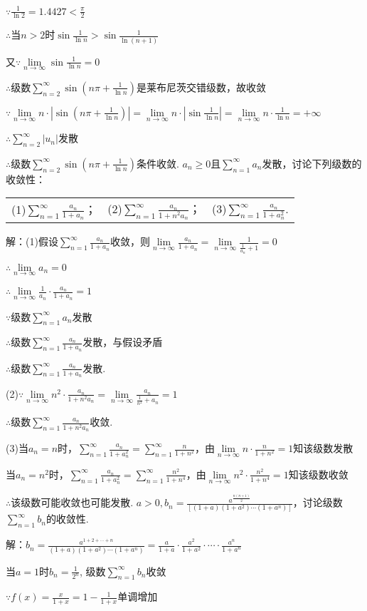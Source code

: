 \documentclass[12pt,UTF8]{ctexart}
\newcommand\Lim[0]{\lim\limits_{n\rightarrow\infty}}
\newcommand\Ser[1]{\sum_{n=#1}^\infty}
\begin{document}
\begin{enumerate}
$\because\frac1{\ln 2}=1.4427<\frac\pi2$

$\therefore$当$n>2$时$\sin\frac1{\ln n}>\sin\frac1{\ln(n+1)}$

又$\because\Lim\sin\frac1{\ln n}=0$

$\therefore$级数$\Ser{2}\sin(n\pi+\frac1{\ln n})$是莱布尼茨交错级数，故收敛

$\because\Lim n\cdot|\sin(n\pi+\frac1{\ln n})|=\Lim n\cdot|\sin\frac1{\ln n}|=\Lim n\cdot\frac1{\ln n}=+\infty$

$\therefore\Ser{2}|u_n|$发散

$\therefore$级数$\Ser{2}\sin(n\pi+\frac1{\ln n})$条件收敛.
$a_n\geq0$且$\Ser{1}a_n$发散，讨论下列级数的收敛性：

\begin{tabular}{lll}
(1)$\Ser{1}\frac{a_n}{1+a_n}$；& (2)$\Ser{1}\frac{a_n}{1+n^2a_n}$；& (3)$\Ser{1}\frac{a_n}{1+a_n^2}$.
\end{tabular}

解：(1)假设$\Ser{1}\frac{a_n}{1+a_n}$收敛，则$\Lim\frac{a_n}{1+a_n}=\Lim\frac1{\frac1{a_n}+1}=0$

$\therefore\Lim a_n=0$

$\therefore\Lim\frac1{a_n}\cdot\frac{a_n}{1+a_n}=1$

$\because$级数$\Ser{1}a_n$发散

$\therefore$级数$\Ser{1}\frac{a_n}{1+a_n}$发散，与假设矛盾

$\therefore$级数$\Ser{1}\frac{a_n}{1+a_n}$发散.

(2)$\because\Lim n^2\cdot\frac{a_n}{1+n^2a_n}=\Lim\frac{a_n}{\frac1{n^2}+a_n}=1$

$\therefore$级数$\Ser{1}\frac{a_n}{1+n^2a_n}$收敛.

(3)当$a_n=n$时，$\Ser{1}\frac{a_n}{1+a_n^2}=\Ser{1}\frac n{1+n^2}$，由$\Lim n\cdot\frac n{1+n^2}=1$知该级数发散

当$a_n=n^2$时，$\Ser{1}\frac{a_n}{1+a_n^2}=\Ser{1}\frac{n^2}{1+n^4}$，由$\Lim n^2\cdot\frac{n^2}{1+n^4}=1$知该级数收敛

$\therefore$该级数可能收敛也可能发散.
$a>0,b_n=\frac{a^{\frac{n(n+1)}2}}{[(1+a)(1+a^2)\cdots(1+a^n)]}$，讨论级数$\Ser{1}b_n$的收敛性.

解：$b_n=\frac{a^{1+2+\cdots+n}}{(1+a)(1+a^2)\cdots(1+a^n)}=\frac a{1+a}\cdot\frac{a^2}{1+a^2}\cdot\cdots\cdot\frac{a^n}{1+a^n}$

当$a=1$时$b_n=\frac1{2^n}$, 级数$\Ser{1}b_n$收敛

$\because f(x)=\frac x{1+x}=1-\frac1{1+x}$单调增加


\end{enumerate}
\end{document}
